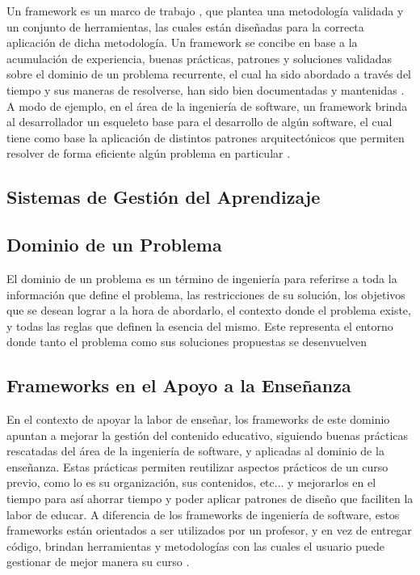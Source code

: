 \documentclass[letterpaper,12pt]{article}
\begin{document}
Un framework es un marco de trabajo \cite{la2012aprendizaje}, que plantea una metodología validada y un conjunto de herramientas, las cuales están diseñadas para la correcta aplicación de dicha metodología. Un framework se concibe en base a la acumulación de experiencia, buenas prácticas, patrones y soluciones validadas sobre el dominio de un problema recurrente, el cual ha sido abordado a través del tiempo y sus maneras de resolverse, han sido bien documentadas y mantenidas \cite{10.5555/326112}. A modo de ejemplo, en el área de la ingeniería de software, un framework brinda al desarrollador un esqueleto base para el desarrollo de algún software, el cual tiene como base la aplicación de distintos patrones arquitectónicos que permiten resolver de forma eficiente algún problema en particular \cite{elearn}.

\subsection{Sistemas de Gestión del Aprendizaje}


\subsection{Dominio de un Problema}

El dominio de un problema es un término de ingeniería para referirse a toda la información que define el problema, las restricciones de su solución, los objetivos que se desean lograr a la hora de abordarlo, el contexto donde el problema existe, y todas las reglas que definen la esencia del mismo. Este representa el entorno donde tanto el problema como sus soluciones propuestas se desenvuelven \cite{ProblemDomain}

\subsection{Frameworks en el Apoyo a la Enseñanza}

En el contexto de apoyar la labor de enseñar, los frameworks de este dominio apuntan a mejorar la gestión del contenido educativo, siguiendo buenas prácticas rescatadas del área de la ingeniería de software, y aplicadas al dominio de la enseñanza. Estas prácticas permiten reutilizar aspectos prácticos de un curso previo, como lo es su organización, sus contenidos, etc... y mejorarlos en el tiempo para así ahorrar tiempo y poder aplicar patrones de diseño que faciliten la labor de educar. A diferencia de los frameworks de ingeniería de software, estos frameworks están orientados a ser utilizados por un profesor, y en vez de entregar código, brindan herramientas y metodologías con las cuales el usuario puede gestionar de mejor manera su curso \cite{elearn}.
\end{document}
